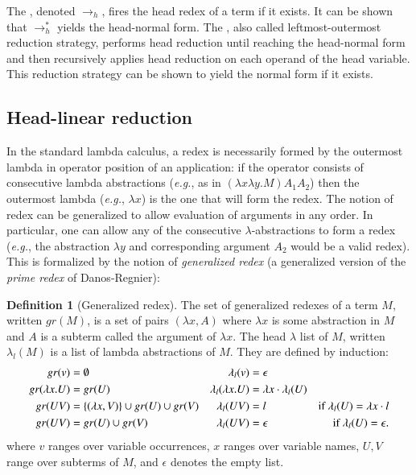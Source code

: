 \documentclass{elsarticle}
\makeatletter
\theoremstyle{plain}
\theoremstyle{definition}
\newtheorem{definition}{Definition}[section]
\theoremstyle{remark}
\renewcommand\eg{{\it e.g.\@\xspace}}
\makeatother
\begin{document}
The , denoted $\rightarrow_{h}$, fires the head redex of a term if it exists. It can be shown that $\rightarrow^*_{h}$ yields the head-normal form. The , also called leftmost-outermost reduction strategy, performs head reduction until reaching the head-normal form and then recursively applies head reduction on each operand of the head variable. This reduction strategy can be shown to yield the normal form if it exists.


\subsection{Head-linear reduction}
In the standard lambda calculus, a redex is necessarily formed by the outermost lambda in operator position of an application: if the operator consists of consecutive lambda abstractions (\eg, as in $(\lambda x \lambda y . M) A_1 A_2$) then the outermost lambda (\eg, $\lambda x$) is the one that will form the redex. The notion of redex can be generalized to allow evaluation of arguments in any order. In particular, one can allow any of the consecutive $\lambda$-abstractions to form a redex (\eg, the abstraction $\lambda y$ and corresponding argument $A_2$ would be a valid redex). This is formalized by the notion of \emph{generalized redex} (a generalized version of the \emph{prime redex} of Danos-Regnier):

\begin{definition}[Generalized redex]
\label{dfn:generalized_redex}
The set of generalized redexes of a term $M$, written $gr(M)$, is a set of pairs $(\lambda x, A)$ where $\lambda x$ is some abstraction in $M$ and $A$ is a subterm called the argument of $\lambda x$. The head $\lambda$ list of $M$, written $\lambda_l(M)$ is a list of lambda abstractions of $M$. They are defined by induction:
\begin{align*}
gr(v) &= \emptyset & \lambda_l(v) &= \epsilon\\
gr(\lambda x. U) &= gr(U) & \lambda_l(\lambda x. U) &= \lambda x \cdot \lambda_l(U) \\
gr(U V) &= \{ (\lambda x, V) \} \cup gr(U) \cup gr(V) &
\lambda_l(U V) &= l & \mbox{if $\lambda_l(U) = \lambda x \cdot l$} \\
gr(U V) &= gr(U) \cup gr(V) & \lambda_l(U V) &= \epsilon & \mbox{if $\lambda_l(U) = \epsilon$.}
\end{align*}
where $v$ ranges over variable occurrences, $x$ ranges over variable names, $U, V$ range over subterms of $M$, and $\epsilon$ denotes the empty list.
\end{definition}
\end{document}
